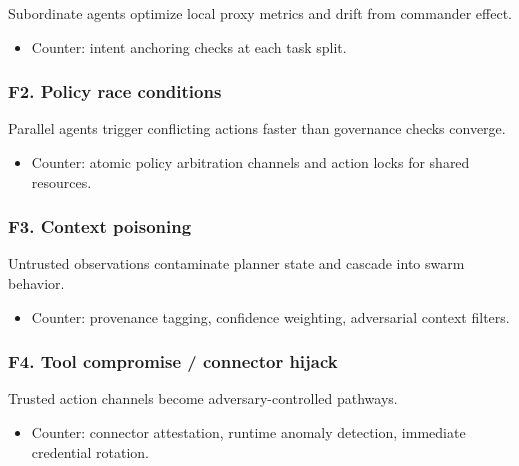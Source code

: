 \documentclass[
]{article}
\providecommand{\tightlist}{%
  \setlength{\itemsep}{0pt}\setlength{\parskip}{0pt}}
\begin{document}
Subordinate agents optimize local proxy metrics and drift from commander
effect.

\begin{itemize}
\tightlist
\item
  Counter: intent anchoring checks at each task split.
\end{itemize}

\hypertarget{f2.-policy-race-conditions}{%
\subsubsection{F2. Policy race
conditions}\label{f2.-policy-race-conditions}}

Parallel agents trigger conflicting actions faster than governance
checks converge.

\begin{itemize}
\tightlist
\item
  Counter: atomic policy arbitration channels and action locks for
  shared resources.
\end{itemize}

\hypertarget{f3.-context-poisoning}{%
\subsubsection{F3. Context poisoning}\label{f3.-context-poisoning}}

Untrusted observations contaminate planner state and cascade into swarm
behavior.

\begin{itemize}
\tightlist
\item
  Counter: provenance tagging, confidence weighting, adversarial context
  filters.
\end{itemize}

\hypertarget{f4.-tool-compromise-connector-hijack}{%
\subsubsection{F4. Tool compromise / connector
hijack}\label{f4.-tool-compromise-connector-hijack}}

Trusted action channels become adversary-controlled pathways.

\begin{itemize}
\tightlist
\item
  Counter: connector attestation, runtime anomaly detection, immediate
  credential rotation.
\end{itemize}
\end{document}
